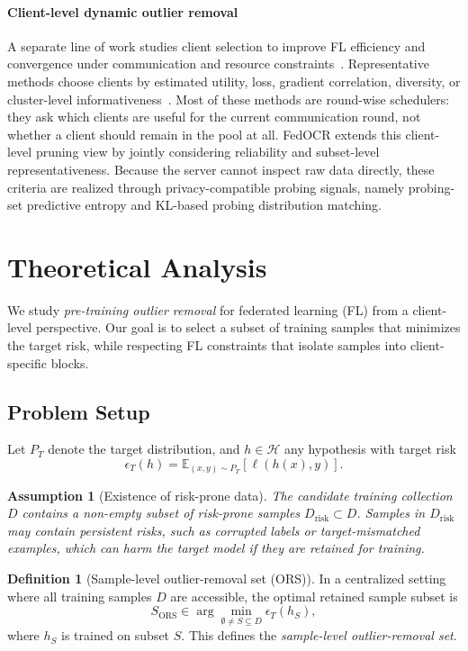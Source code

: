 ﻿\documentclass[conference]{IEEEtran}
\newtheorem{assumption}{Assumption}
\theoremstyle{definition}
\newtheorem{definition}{Definition}
\theoremstyle{remark}
\begin{document}
\paragraph{\textbf{Client-level dynamic outlier removal}}
A separate line of work studies client selection to improve FL efficiency and convergence under communication and resource constraints~\cite{fu2023client,almanifi2023communication,le2024practicality,jia2025comst}.
Representative methods choose clients by estimated utility, loss, gradient correlation, diversity, or cluster-level informativeness~\cite{lai2021oort,cho2022power,tang2022fedcor,zhang2023dpp,ACFL}.
Most of these methods are round-wise schedulers: they ask which clients are useful for the current communication round, not whether a client should remain in the pool at all.
FedOCR extends this client-level pruning view by jointly considering reliability and subset-level representativeness.
Because the server cannot inspect raw data directly, these criteria are realized through privacy-compatible probing signals, namely probing-set predictive entropy and KL-based probing distribution matching.

\section{Theoretical Analysis}
\label{sec:theoretical_analysis}

We study \emph{pre-training outlier removal} for federated learning (FL) from a client-level perspective. 
Our goal is to select a subset of training samples that minimizes the target risk, while respecting FL constraints that isolate samples into client-specific blocks.

\subsection{Problem Setup}
\label{subsec:problem_setup}
Let $P_T$ denote the target distribution, and $h\in\mathcal{H}$ any hypothesis with target risk
\begin{equation}
	\epsilon_T(h) = \mathbb{E}_{(x,y)\sim P_T}[\ell(h(x),y)].
\end{equation}
\begin{assumption}[Existence of risk-prone data]
	\label{assump:risk_prone_data}
	The candidate training collection $D$ contains a non-empty subset of risk-prone samples
	$D_{\mathrm{risk}}\subset D$.
	Samples in $D_{\mathrm{risk}}$ may contain persistent risks, such as corrupted labels or target-mismatched examples, which can harm the target model if they are retained for training.
\end{assumption}
\begin{definition}[Sample-level outlier-removal set (ORS)]
	\label{def:sample_golden_set}
	In a centralized setting where all training samples $D$ are accessible, the optimal retained sample subset is
	\begin{equation}
		S_{\mathrm{ORS}} \in \arg\min_{\emptyset\neq 
		S\subseteq D} \epsilon_T(h_S),
	\end{equation}
	where $h_S$ is trained on subset $S$. This defines the \emph{sample-level outlier-removal set}.
\end{definition}
\end{document}
